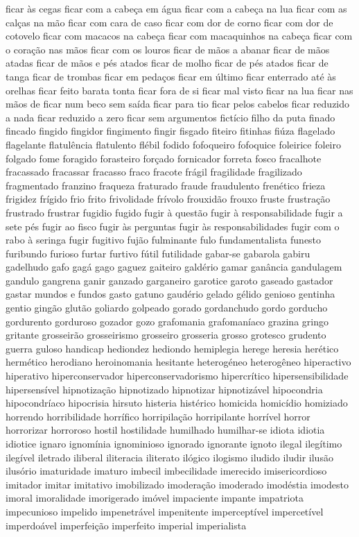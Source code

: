 \documentclass[ruledheader]{abnt_UFF}
\begin{document}
ficar \`{a}s cegas ficar com a cabe\c{c}a em \'{a}gua ficar com a cabe\c{c}a na lua ficar com as cal\c{c}as na m\~ao ficar com cara de caso ficar com dor de corno ficar com dor de cotovelo ficar com macacos na cabe\c{c}a ficar com macaquinhos na cabe\c{c}a ficar com o cora\c{c}\~ao nas m\~aos ficar com os louros ficar de m\~aos a abanar ficar de m\~aos atadas ficar de m\~aos e p\'{e}s atados ficar de molho ficar de p\'{e}s atados ficar de tanga ficar de trombas ficar em peda\c{c}os ficar em \'{u}ltimo ficar enterrado at\'{e} \`{a}s orelhas ficar feito barata tonta ficar fora de si ficar mal visto ficar na lua ficar nas m\~aos de ficar num beco sem sa\'{i}da ficar para tio ficar pelos cabelos ficar reduzido a nada ficar reduzido a zero ficar sem argumentos fict\'{i}cio filho da puta finado fincado fingido fingidor fingimento fingir fisgado fiteiro fitinhas fi\'{u}za flagelado flagelante flatul\^{e}ncia flatulento fl\'{e}bil fodido fofoqueiro fofoquice foleirice foleiro folgado fome foragido forasteiro for\c{c}ado fornicador forreta fosco fracalhote fracassado fracassar fracasso fraco fracote fr\'{a}gil fragilidade fragilizado fragmentado franzino fraqueza fraturado fraude fraudulento fren\'{e}tico frieza frigidez fr\'{i}gido frio frito frivolidade fr\'{i}volo frouxid\~ao frouxo fruste frustra\c{c}\~ao frustrado frustrar fugidio fugido fugir \`{a} quest\~ao fugir \`{a} responsabilidade fugir a sete p\'{e}s fugir ao fisco fugir \`{a}s perguntas fugir \`{a}s responsabilidades fugir com o rabo \`{a} seringa fugir fugitivo fuj\~ao fulminante fulo fundamentalista funesto furibundo furioso furtar furtivo f\'{u}til futilidade gabar-se gabarola gabiru gadelhudo gafo gag\'{a} gago gaguez gaiteiro gald\'{e}rio gamar gan\^{a}ncia gandulagem gandulo gangrena ganir ganzado garganeiro garotice garoto gaseado gastador gastar mundos e fundos gasto gatuno gaud\'{e}rio gelado g\'{e}lido genioso gentinha gentio ging\~ao glut\~ao goliardo golpeado gorado gordanchudo gordo gorducho gordurento gorduroso gozador gozo grafomania grafoman\'{i}aco grazina gringo gritante grosseir\~ao grosseirismo grosseiro grosseria grosso grotesco grudento guerra guloso handicap hediondez hediondo hemiplegia herege heresia her\'{e}tico herm\'{e}tico herodiano heroinomania hesitante heterog\'{e}neo heterog\^{e}neo hiperactivo hiperativo hiperconservador hiperconservadorismo hipercr\'{i}tico hipersensibilidade hipersens\'{i}vel hipnotiza\c{c}\~ao hipnotizado hipnotizar hipnotiz\'{a}vel hipocondria hipocondr\'{i}aco hipocrisia hirsuto histeria hist\'{e}rico homicida homic\'{i}dio homiziado horrendo horribilidade horr\'{i}fico horripila\c{c}\~ao horripilante horr\'{i}vel horror horrorizar horroroso hostil hostilidade humilhado humilhar-se idiota idiotia idiotice ignaro ignom\'{i}nia ignominioso ignorado ignorante ignoto ilegal ileg\'{i}timo ileg\'{i}vel iletrado iliberal iliteracia iliterato il\'{o}gico ilogismo iludido iludir ilus\~ao ilus\'{o}rio imaturidade imaturo imbecil imbecilidade imerecido imisericordioso imitador imitar imitativo imobilizado imodera\c{c}\~ao imoderado imod\'{e}stia imodesto imoral imoralidade imorigerado im\'{o}vel impaciente impante impatriota impecunioso impelido impenetr\'{a}vel impenitente impercept\'{i}vel impercet\'{i}vel imperdo\'{a}vel imperfei\c{c}\~ao imperfeito imperial imperialista 
\end{document}
